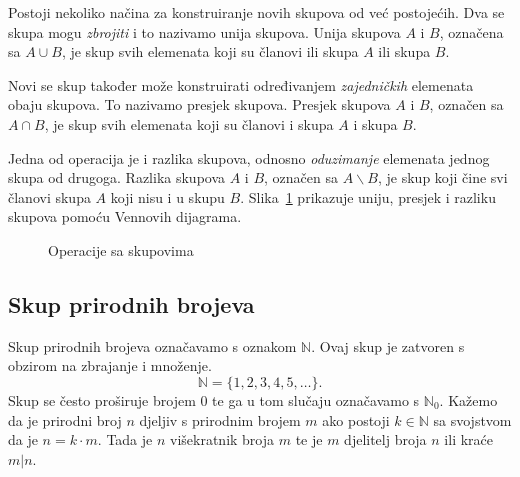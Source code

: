 Postoji nekoliko načina za konstruiranje novih skupova od već postojećih.
Dva se skupa mogu \emph{zbrojiti} i to nazivamo unija skupova.
Unija skupova $A$ i $B$, označena sa $A \cup B$, je skup svih elemenata koji su članovi ili skupa $A$ ili skupa $B$.

Novi se skup također može konstruirati određivanjem \emph{zajedničkih} elemenata obaju skupova.
To nazivamo presjek skupova.
Presjek skupova $A$ i $B$, označen sa $A \cap B$, je skup svih elemenata koji su članovi i skupa $A$ i skupa $B$.

Jedna od operacija je i razlika skupova, odnosno \emph{oduzimanje} elemenata jednog skupa od drugoga.
Razlika skupova $A$ i $B$, označen sa $A \backslash B$, je skup koji čine svi članovi skupa $A$ koji nisu i u skupu $B$.
Slika~\ref{fig:operacije-sa-skupovima} prikazuje uniju, presjek i razliku skupova pomoću Vennovih dijagrama.

\begin{figure}[h!]
\begin{center}\vspace{0.25cm}
\end{center}
\caption{Operacije sa skupovima}\label{fig:operacije-sa-skupovima}
\end{figure}

\subsection{Skup prirodnih brojeva}\label{subsec:skup-prirodnih-brojeva}
Skup prirodnih brojeva označavamo s oznakom $\mathbb{N}$.
Ovaj skup je zatvoren s obzirom na zbrajanje i množenje.
\[ \mathbb{N}=\{1,2,3,4,5,\ldots\}. \]
Skup se često proširuje brojem 0 te ga u tom slučaju označavamo s $\mathbb{N}_0$.
Kažemo da je prirodni broj $n$ djeljiv s prirodnim brojem $m$ ako postoji $k \in \mathbb{N}$ sa svojstvom da je $n=k \cdot m$.
Tada je $n$ višekratnik broja $m$ te je $m$ djelitelj broja $n$ ili kraće $m|n$.


